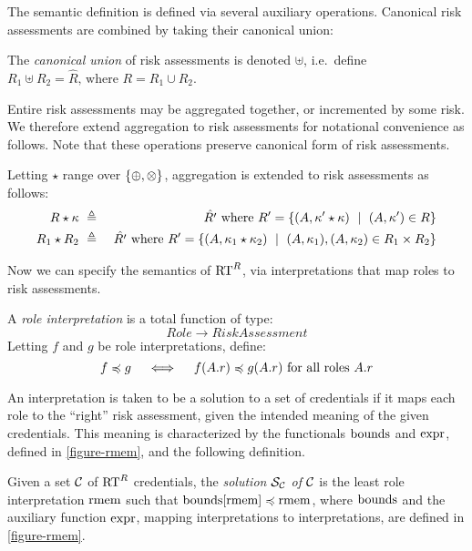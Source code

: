 The semantic definition is defined via several auxiliary operations.
Canonical risk assessments are combined by taking their canonical
union:
\begin{definition}
The \emph{canonical union} of risk assessments is denoted $\uplus$, 
i.e.~define $R_1 \uplus R_2 = \hat{R}\text{, where } R = R_1 \cup R_2$.
\end{definition}
Entire risk assessments may be aggregated together, or incremented by
some risk.  We therefore extend aggregation to risk assessments for
notational convenience as follows.  Note that these operations 
preserve canonical form of risk assessments.
\begin{definition}
\label{def-aggregation-risk-assessments}
Letting $\star$ range over $\left\{\oplus, \otimes\right\}$,
aggregation is extended to risk assessments as follows:
\begin{eqnarray*}
R \star \risk &\ \defeq\ & \hat{R'}\text{ where } R' = \setdefn{(A,\risk' \star \risk) \ \mid\ (A,\risk') \in R}\\
R_1 \star R_2 &\ \defeq\ &\hat{R'}\text{ where } R' = 
\setdefn{(A,\risk_1 \star \risk_2) \ \mid\ 
(A,\risk_1), (A,\risk_2) \in R_1 \times R_2} 
\end{eqnarray*}
\end{definition}

Now we can specify the semantics of $\text{RT}^R$, via interpretations that
map roles to risk assessments.  
\begin{definition}
A \emph{role interpretation} is a total function of type:$$
\mathit{Role} \rightarrow \mathit{RiskAssessment}
$$ 
Letting $f$ and $g$ be role interpretations, define:
$$
f \preccurlyeq g \quad\iff\quad f(A.r) \preccurlyeq g(A.r) \text{ for all roles } A.r
$$
\end{definition}
An interpretation is taken to be a solution to a set of credentials if
it maps each role to the ``right'' risk assessment, given the intended
meaning of the given credentials.  This meaning is characterized by
the functionals $\mathrm{bounds}$ and $\mathrm{expr}$, defined in
\autoref{figure-rmem}, and the following definition.

\begin{definition} 
\label{def-solution}
Given a set $\mathcal{C}$ of $\text{RT}^R$ credentials, the \emph{solution
$\mathcal{S}_{\mathcal{C}}$ of $\mathcal{C}$} is the least role interpretation
$\mathrm{rmem}$ such that $\mathrm{bounds}[\mathrm{rmem}] \preccurlyeq \mathrm{rmem}$, where $\mathrm{bounds}$
and the auxiliary function $\mathrm{expr}$, mapping interpretations to 
interpretations, are defined in \autoref{figure-rmem}.
\end{definition}

